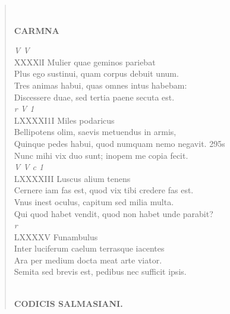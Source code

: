 \documentclass[11pt, a4paper]{report}
\begin{document}
\begin{verse}
        ﻿\pagebreak 
    \begin{center} \textbf{CARMNA} \end{center} \marginpar{[244]} \textit{V V} \\ XXXXlI Mulier quae geminos pariebat \\ Plus ego sustinui, quam corpus debuit unum. \\ Tres animas habui, quas omnes intus habebam: \\ Discessere duae, sed tertia paene secuta est. \\ \textit{r V 1} \\ LXXXXI1I Miles podaricus \\ Bellipotens olim, saevis metuendus in armis, \\ Quinque pedes habui, quod numquam nemo negavit. 295s \\ Nunc mihi vix duo sunt; inopem me copia fecit. \\ \textit{V V c 1} \\ LXXXXIII Luscus alium tenens \\ Cernere iam fas est, quod vix tibi credere fas est. \\ Vnus inest oculus, capitum sed milia multa. \\ Qui quod habet vendit, quod non habet unde parabit? \\ \textit{r} \\ LXXXXV Funambulus \\ Inter luciferum caelum terrasque iacentes \\ Ara per medium docta meat arte viator. \\ Semita sed brevis est, pedibus nec sufficit ipsis. \\ 
        ﻿\pagebreak 
    \begin{center} \textbf{CODICIS SALMASIANI.} \end{center} \marginpar{[245]} 
      \end{verse}
  
\end{document}

